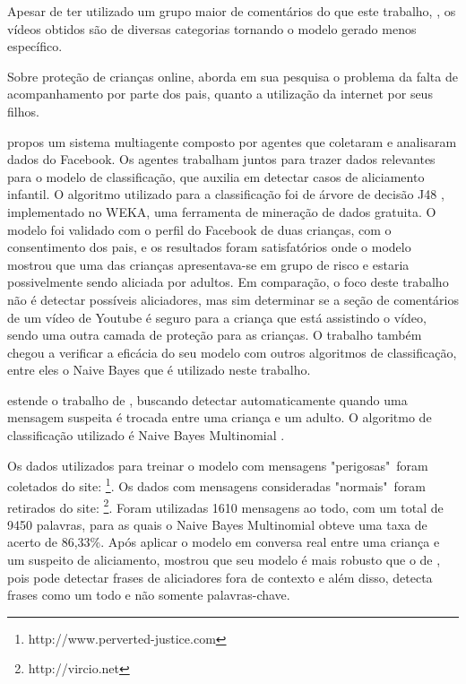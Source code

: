 Apesar de ter utilizado um grupo maior de comentários do que este trabalho, , os vídeos obtidos são de diversas categorias tornando o modelo gerado menos específico.

Sobre proteção de crianças online,  aborda em sua pesquisa o problema da falta de acompanhamento por parte dos pais, quanto a utilização da internet por seus filhos. 

\cite{marioFalcao2016} propos um sistema multiagente composto por agentes que coletaram e analisaram dados do Facebook. Os agentes trabalham juntos para trazer dados relevantes para o modelo de classificação, que auxilia em detectar casos de aliciamento infantil. O algoritmo utilizado para a classificação foi de árvore de decisão J48 \cite{quinlan1986induction}, implementado no WEKA, uma ferramenta de mineração de dados gratuita. O modelo foi validado com o perfil do Facebook de duas crianças, com o consentimento dos pais, e os resultados foram satisfatórios onde o modelo mostrou que uma das crianças apresentava-se em grupo de risco e estaria possivelmente sendo aliciada por adultos. 
Em comparação, o foco deste trabalho não é detectar possíveis aliciadores, mas sim determinar se a seção de comentários de um vídeo de Youtube é seguro para a criança que está assistindo o vídeo, sendo uma outra camada de proteção para as crianças. O trabalho \cite{marioFalcao2016} também chegou a verificar a eficácia do seu modelo com outros algoritmos de classificação, entre eles o Naive Bayes que é utilizado neste trabalho.

\cite{EnyoGoncalves2017} estende o trabalho de \cite{marioFalcao2016}, buscando detectar automaticamente quando uma mensagem suspeita é trocada entre uma criança e um adulto. O algoritmo de classificação utilizado é Naive Bayes Multinomial \cite{metsis2006spamBayes}.

Os dados utilizados para treinar o modelo com mensagens "perigosas"\ foram coletados do site: \footnote{http://www.perverted-justice.com}. Os dados com mensagens consideradas "normais"\  foram retirados do site: \footnote{http://vircio.net}. Foram utilizadas 1610 mensagens ao todo, com um total de 9450 palavras, para as quais o Naive Bayes Multinomial obteve uma taxa de acerto de 86,33\%. Após aplicar o modelo em conversa real entre uma criança e um suspeito de aliciamento, \cite{EnyoGoncalves2017} mostrou que seu modelo é mais robusto que o de \cite{marioFalcao2016}, pois pode detectar frases de aliciadores fora de contexto e além disso, detecta frases como um todo e não somente palavras-chave.

